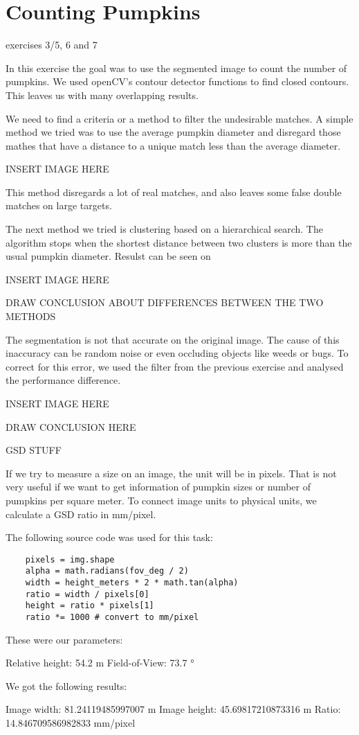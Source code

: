 \documentclass[../Head/Main.tex]{subfiles}
\begin{document}
\section{Counting Pumpkins}
exercises 3/5, 6 and 7

In this exercise the goal was to use the segmented image to count the number of pumpkins. We used openCV's contour detector functions to find closed contours. This leaves us with many overlapping results.

We need to find a criteria or a method to filter the undesirable matches. A simple method we tried was to use the average pumpkin diameter and disregard those mathes that have a distance to a unique match less than the average diameter.

INSERT IMAGE HERE

This method disregards a lot of real matches, and also leaves some false double matches on large targets.

The next method we tried is clustering based on a hierarchical search. The algorithm stops when the shortest distance between two clusters is more than the usual pumpkin diameter. Resulst can be seen on

INSERT IMAGE HERE

DRAW CONCLUSION ABOUT DIFFERENCES BETWEEN THE TWO METHODS

The segmentation is not that accurate on the original image. The cause of this inaccuracy can be random noise or even occluding objects like weeds or bugs. To correct for this error, we used the filter from the previous exercise and analysed the performance difference.

INSERT IMAGE HERE

DRAW CONCLUSION HERE

GSD STUFF

If we try to measure a size on an image, the unit will be in pixels. That is not very useful if we want to get information of pumpkin sizes or number of pumpkins per square meter. To connect image units to physical units, we calculate a GSD ratio in mm/pixel.

The following source code was used for this task:

\begin{verbatim}
    pixels = img.shape
    alpha = math.radians(fov_deg / 2)
    width = height_meters * 2 * math.tan(alpha)
    ratio = width / pixels[0]
    height = ratio * pixels[1]
    ratio *= 1000 # convert to mm/pixel
\end{verbatim}

These were our parameters:

Relative height: 54.2 m
Field-of-View: 73.7 °


We got the following results:

Image width: 81.24119485997007 m
Image height: 45.69817210873316 m
Ratio: 14.846709586982833 mm/pixel
\end{document}
